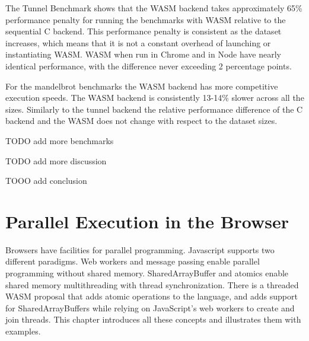 \documentclass[11pt]{book}
\begin{document}
The Tunnel Benchmark shows that the WASM backend takes approximately 65\% performance penalty for running the benchmarks with WASM relative to the sequential C backend. This performance penalty is consistent as the dataset increases, which means that it is not a constant overhead of launching or instantiating WASM. WASM when run in Chrome and in Node have nearly identical performance, with the difference never exceeding 2 percentage points.

\begin{table}[h!]
    \noindent{}
    \caption{Caption}
    \label{tab:my_label}
\end{table}

For the mandelbrot benchmarks the WASM backend has more competitive execution speeds. The WASM backend is consistently 13-14\% slower across all the sizes. Similarly to the tunnel backend the relative performance difference of the C backend and the WASM does not change with respect to the dataset sizes.


TODO add more benchmarks

TODO add more discussion

TOOO add conclusion

\chapter{Parallel Execution in the Browser}


Browsers have facilities for parallel programming. Javascript supports two different paradigms. Web workers and message passing enable parallel programming without shared memory. SharedArrayBuffer and atomics enable shared memory multithreading with thread synchronization. There is a threaded WASM proposal that adds atomic operations to the language, and adds support for SharedArrayBuffers while relying on JavaScript's web workers to create and join threads. This chapter introduces all these concepts and illustrates them with examples.
\end{document}
